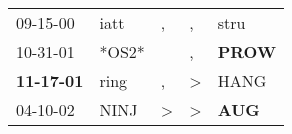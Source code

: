 \begin{supertabular}{p{0.07\textwidth}p{0.06\textwidth}p{0.02\textwidth}p{0.02\textwidth}p{0.06\textwidth}}
          09-15-00\textsuperscript{} &  iatt\textsuperscript{} &             , &             , &           stru\textsuperscript{} \\
          10-31-01\textsuperscript{} &                   *OS2* &               &             , &  \textbf{PROW\textsuperscript{}} \\
 \textbf{11-17-01\textsuperscript{}} &  ring\textsuperscript{} &             , &  \textgreater &           HANG\textsuperscript{} \\
          04-10-02\textsuperscript{} &  NINJ\textsuperscript{} &  \textgreater &  \textgreater &   \textbf{AUG\textsuperscript{}} \\
\end{supertabular}
